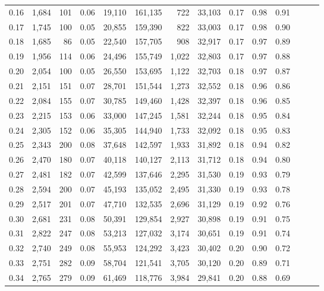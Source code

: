 \begin{tabular}{rrrrrrrrrrrrrr}
0.16 &  1,684 &  101 &  0.06 &   19,110 &  161,135 &     722 &  33,103 &  0.17 &  0.98 &      0.91 \\
0.17 &  1,745 &  100 &  0.05 &   20,855 &  159,390 &     822 &  33,003 &  0.17 &  0.98 &      0.90 \\
0.18 &  1,685 &   86 &  0.05 &   22,540 &  157,705 &     908 &  32,917 &  0.17 &  0.97 &      0.89 \\
0.19 &  1,956 &  114 &  0.06 &   24,496 &  155,749 &   1,022 &  32,803 &  0.17 &  0.97 &      0.88 \\
0.20 &  2,054 &  100 &  0.05 &   26,550 &  153,695 &   1,122 &  32,703 &  0.18 &  0.97 &      0.87 \\
0.21 &  2,151 &  151 &  0.07 &   28,701 &  151,544 &   1,273 &  32,552 &  0.18 &  0.96 &      0.86 \\
0.22 &  2,084 &  155 &  0.07 &   30,785 &  149,460 &   1,428 &  32,397 &  0.18 &  0.96 &      0.85 \\
0.23 &  2,215 &  153 &  0.06 &   33,000 &  147,245 &   1,581 &  32,244 &  0.18 &  0.95 &      0.84 \\
0.24 &  2,305 &  152 &  0.06 &   35,305 &  144,940 &   1,733 &  32,092 &  0.18 &  0.95 &      0.83 \\
0.25 &  2,343 &  200 &  0.08 &   37,648 &  142,597 &   1,933 &  31,892 &  0.18 &  0.94 &      0.82 \\
0.26 &  2,470 &  180 &  0.07 &   40,118 &  140,127 &   2,113 &  31,712 &  0.18 &  0.94 &      0.80 \\
0.27 &  2,481 &  182 &  0.07 &   42,599 &  137,646 &   2,295 &  31,530 &  0.19 &  0.93 &      0.79 \\
0.28 &  2,594 &  200 &  0.07 &   45,193 &  135,052 &   2,495 &  31,330 &  0.19 &  0.93 &      0.78 \\
0.29 &  2,517 &  201 &  0.07 &   47,710 &  132,535 &   2,696 &  31,129 &  0.19 &  0.92 &      0.76 \\
0.30 &  2,681 &  231 &  0.08 &   50,391 &  129,854 &   2,927 &  30,898 &  0.19 &  0.91 &      0.75 \\
0.31 &  2,822 &  247 &  0.08 &   53,213 &  127,032 &   3,174 &  30,651 &  0.19 &  0.91 &      0.74 \\
0.32 &  2,740 &  249 &  0.08 &   55,953 &  124,292 &   3,423 &  30,402 &  0.20 &  0.90 &      0.72 \\
0.33 &  2,751 &  282 &  0.09 &   58,704 &  121,541 &   3,705 &  30,120 &  0.20 &  0.89 &      0.71 \\
0.34 &  2,765 &  279 &  0.09 &   61,469 &  118,776 &   3,984 &  29,841 &  0.20 &  0.88 &      0.69 \\

\end{tabular}

